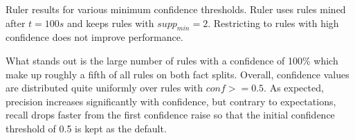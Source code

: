 \begin{table}
    \centering
    
    \caption{Ruler results for various minimum confidence thresholds. Ruler uses rules mined after $t = 100s$ and keeps rules with $supp_{min} = 2$. Restricting to rules with high confidence does not improve performance.}
    \label{tab:5_experiments/4_ruler/3_rule_quality/conf_results}
\end{table}

What stands out is the large number of rules with a confidence of 100\% which make up roughly a fifth of all rules on both fact splits. Overall, confidence values are distributed quite uniformly over rules with $conf >= 0.5$. As expected, precision increases significantly with confidence, but contrary to expectations, recall drops faster from the first confidence raise so that the initial confidence threshold of 0.5 is kept as the default.
